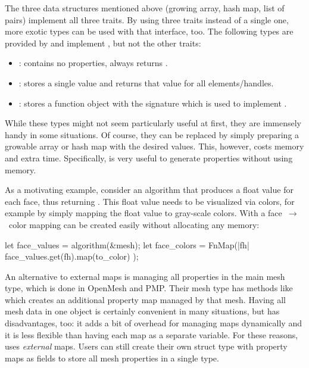 The three data structures mentioned above (growing array, hash map, list of pairs) implement all three traits.
By using three traits instead of a single one, more exotic types can be used with that interface, too.
The following types are provided by  and implement , but not the other traits:

\newpage
\begin{itemize}
\item {}: contains no properties, always returns .
\item {}: stores a single value and returns that value for all elements/handles.
\item {}: stores a function object with the signature  which is used to implement .
\end{itemize}

While these types might not seem particularly useful at first, they are immensely handy in some situations.
Of course, they can be replaced by simply preparing a growable array or hash map with the desired values.
This, however, costs memory and extra time.
Specifically,  is very useful to generate properties without using memory.

As a motivating example, consider an algorithm that produces a float value for each face, thus returning .
This float value needs to be visualized via colors, for example by simply mapping the float value to gray-scale colors.
With  a face~$\rightarrow$~color mapping can be created easily without allocating any memory:

\begin{center}
  \begin{minipage}{.59\textwidth}
    \begin{rustcode}
      let face_values = algorithm(&mesh);
      let face_colors = FnMap(|fh| {
          face_values.get(fh).map(to_color)
      });
    \end{rustcode}
  \end{minipage}
\end{center}
\vspace{1cm}

An alternative to external maps is managing all properties in the main mesh type, which is done in OpenMesh and PMP.
Their mesh type has methods like  which creates an additional property map managed by that mesh.
Having all mesh data in one object is certainly convenient in many situations, but has disadvantages, too:
it adds a bit of overhead for managing maps dynamically and it is less flexible than having each map as a separate variable.
For these reasons,  uses \emph{external} maps.
Users can still create their own struct type with property maps as fields to store all mesh properties in a single type.


